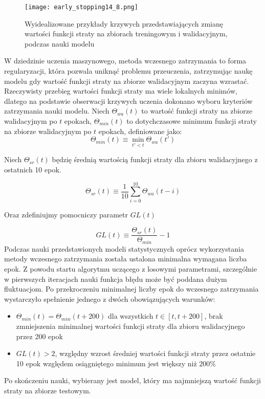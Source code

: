 \documentclass[11pt]{book}
\theoremstyle{definition}
\begin{document}
\begin{figure}[htp!]
	\centering
	\texttt{[image: early\_stopping14\_8.png]}
	\caption{Wyidealizowane przykłady krzywych przedstawiających zmianę wartości funkcji straty na zbiorach treningowym i walidacyjnym, podczas nauki modelu}
	\label{fig:loss_curves}
\end{figure}

W dziedzinie uczenia maszynowego, metoda wczesnego zatrzymania to forma regularyzacji, która pozwala uniknąć problemu przeuczenia, zatrzymując naukę modelu gdy wartość funkcji straty na zbiorze walidacyjnym zaczyna wzrastać. Rzeczywisty przebieg wartości funkcji straty ma wiele lokalnych minimów, dlatego na podstawie obserwacji krzywych uczenia dokonano wyboru kryteriów zatrzymania nauki modelu. 
Niech $\Theta_{wa}(t)$ to wartość funkcji straty na zbiorze walidacyjnym po $t$ epokach, $\Theta_{min}(t)$ to dotychczasowe minimum funkcji straty na zbiorze walidacyjnym po $t$ epokach, definiowane jako:
$$
\Theta_{min}(t) \equiv \min_{t' < t} \Theta_{wa}(t')
$$

Niech $\Theta_{sr}(t)$ będzię średnią wartością funkcji straty dla zbioru walidacyjnego z ostatnich 10 epok.

$$
\Theta_{sr}(t) \equiv \frac{1}{10} \sum_{i=0}^{10} \Theta_{wa}(t-i)
$$

Oraz zdefiniujmy pomocniczy parametr $GL(t)$


$$
GL(t) \equiv \frac{\Theta_{sr}(t)}{\Theta_{min}} - 1
$$
Podczas nauki przedstawionych modeli statystycznych oprócz wykorzystania metody wczesnego zatrzymania została ustalona minimalna wymagana liczba epok. Z powodu startu algorytmu uczącego z losowymi parametrami, szczególnie w pierwszych iteracjach nauki funkcja błędu może być poddana dużym fluktuacjom. Po przekroczeniu minimalnej liczby epok do wczesnego zatrzymania wystarczyło spełnienie jednego z dwóch obowiązujących warunków:

\begin{itemize}
	\item $\Theta_{min}(t) = \Theta_{min}(t+ 200)$ dla wszystkich $t \in [t,t+200]$, brak zmniejszenia minimalnej wartości funkcji straty dla zbioru walidacyjnego przez 200 epok 
	\item $ GL(t)  > 2$, względny wzrost średniej wartości funkcji straty przez ostatnie 10 epok względem osiągniętego minimum jest większy niż $200\%$
\end{itemize}

Po skończeniu nauki, wybierany jest model, który ma najmniejszą wartość funkcji straty na zbiorze testowym.
\end{document}
